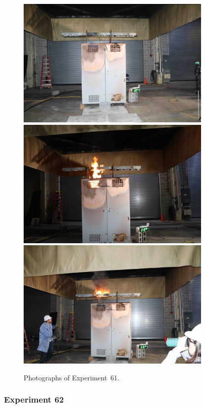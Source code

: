 \begin{figure}[p]
\centering
\includegraphics[height=2.50in]{../FIGURES/Test_61_setup} \\
\includegraphics[height=2.50in]{../FIGURES/Test_61_10_min_28_s} \\
\includegraphics[height=2.50in]{../FIGURES/Test_61_15_min_34_s}
\caption[Photographs of Experiment~61]{Photographs of Experiment~61.}
\label{fig:Test_61_photos}
\end{figure}


\clearpage

\subsubsection{Experiment 62}

